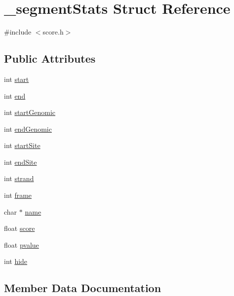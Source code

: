 \hypertarget{struct__segmentStats}{}\section{\+\_\+segment\+Stats Struct Reference}
\label{struct__segmentStats}


{\ttfamily \#include $<$score.\+h$>$}

\subsection*{Public Attributes}
\begin{DoxyCompactItemize}
\item 
int \hyperlink{struct__segmentStats_acbd4b0e7ceaa05b6506aab77d2bf1090}{start}
\item 
int \hyperlink{struct__segmentStats_a4d3d7af903f88c69e687d259590b00a3}{end}
\item 
int \hyperlink{struct__segmentStats_a95a69dcd9686db97033daded2f42878b}{start\+Genomic}
\item 
int \hyperlink{struct__segmentStats_acf8d8441557c049db6d84d96ed7f7ca3}{end\+Genomic}
\item 
int \hyperlink{struct__segmentStats_a403f946ddab65393861d93fbb81f0d5a}{start\+Site}
\item 
int \hyperlink{struct__segmentStats_af419d597e7393b0e78078eaa842ded6c}{end\+Site}
\item 
int \hyperlink{struct__segmentStats_a84cfdd51d1e7fe9555f887c3658e9ced}{strand}
\item 
int \hyperlink{struct__segmentStats_aaa79b059634ee49ceb65150735dae1dd}{frame}
\item 
char $\ast$ \hyperlink{struct__segmentStats_aea84cdd90979dc3c173424166ef8d532}{name}
\item 
float \hyperlink{struct__segmentStats_aea28293c9c59198e9f14542d99ac1484}{score}
\item 
float \hyperlink{struct__segmentStats_a36c8958e60d5f733eb6b3bc0e178ad61}{pvalue}
\item 
int \hyperlink{struct__segmentStats_a7db5f703ed1ff2f2105f756cb79eaecf}{hide}
\end{DoxyCompactItemize}


\subsection{Member Data Documentation}
\mbox{\label{struct__segmentStats_a4d3d7af903f88c69e687d259590b00a3}} 
